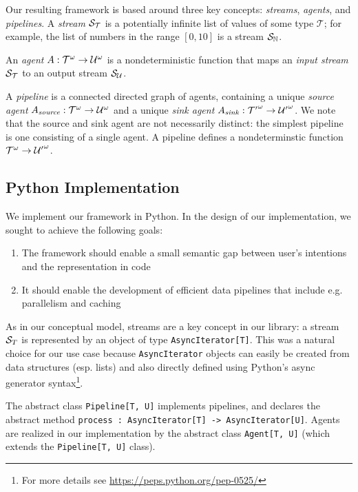 Our resulting framework is based around three key concepts: \emph{streams},
\emph{agents}, and \emph{pipelines}. A \emph{stream} $\mathcal{S}_{\mathcal{T}}$ is a
potentially infinite list of values of some type $\mathcal{T}$; for example, the
list of numbers in the range $[0, 10]$ is a stream $\mathcal{S}_{\mathbb{N}}$.

An \emph{agent} $A : {\mathcal{T}}^{\omega} \rightarrow
{\mathcal{U}}^{\omega}$ is a nondeterministic function that maps an \emph{input
stream} $\mathcal{S}_{\mathcal{T}}$ to an output stream $\mathcal{S}_{\mathcal{U}}$.

A \emph{pipeline} is a connected directed graph of agents, containing a unique
\emph{source agent} $A{}_{\mathit{source}} : {\mathcal{T}}^{\omega}
\rightarrow {\mathcal{U}}^{\omega}$ and a unique \emph{sink agent}
$A_{\mathit{sink}} : {\mathcal{T}'}^{\omega} \rightarrow
{\mathcal{U}'}^{\omega}$. We note that the source and sink agent are not
necessarily distinct: the simplest pipeline is one consisting of a single agent.
A pipeline defines a nondeterminstic function ${\mathcal{T}}^{\omega}
\rightarrow {\mathcal{U}'}^{\omega}$.

\subsection{Python Implementation}

We implement our framework in Python. In the design of our implementation, we
sought to achieve the following goals:

\begin{enumerate}
  \item The framework should enable a small semantic gap \cite{semanticgap}
  between user's intentions and the representation in code
  \item It should enable the development of efficient data pipelines that include
  e.g. parallelism and caching
\end{enumerate}

As in our conceptual model, streams are a key concept in our library: a stream
$\mathcal{S}_{T}$ is represented by an object of type \texttt{AsyncIterator[T]}. This
was a natural choice for our use case because \texttt{AsyncIterator} objects can
easily be created from data structures (esp. lists) and also directly defined
using Python's async generator syntax\footnote{For more details see
\url{https://peps.python.org/pep-0525/}}.

 The abstract class
\texttt{Pipeline[T, U]} implements pipelines, and declares the abstract method
\texttt{process : AsyncIterator[T] -> AsyncIterator[U]}. Agents are realized in
our implementation by the abstract class \texttt{Agent[T, U]} (which extends the
\texttt{Pipeline[T, U]} class).

